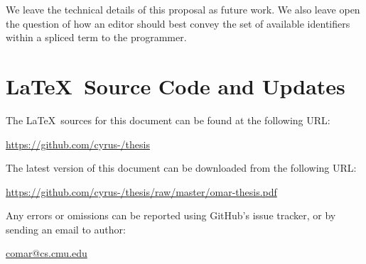 We leave the technical details of this proposal as future work. We also leave open the question of how an editor should best convey the set of available identifiers within a spliced term to the programmer.




\newpage
\section*{\LaTeX~Source Code and Updates}
\noindent
The \LaTeX~sources for this document can be found at the following URL:
\begin{center}
\url{https://github.com/cyrus-/thesis}
\end{center}
The latest version of this document can be downloaded from the following URL:
\begin{center}
\url{https://github.com/cyrus-/thesis/raw/master/omar-thesis.pdf}
\end{center}
Any errors or omissions can be reported using GitHub's issue tracker, or by sending an email to author:
\begin{center}
\url{comar@cs.cmu.edu}
\end{center}
